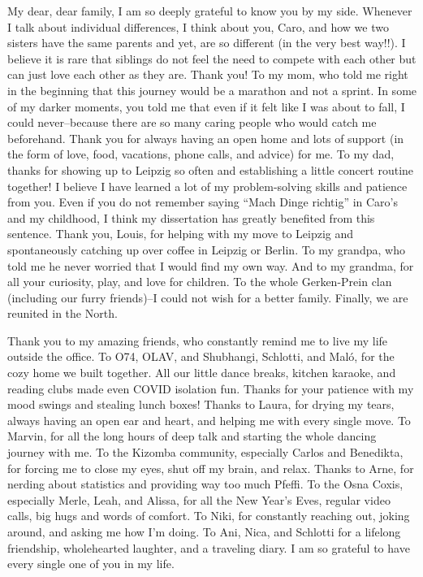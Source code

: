\documentclass[
]{scrbook}
\begin{document}
My dear, dear family, I am so deeply grateful to know you by my side. Whenever I talk about individual differences, I think about you, Caro, and how we two sisters have the same parents and yet, are so different (in the very best way!!). I believe it is rare that siblings do not feel the need to compete with each other but can just love each other as they are. Thank you! To my mom, who told me right in the beginning that this journey would be a marathon and not a sprint. In some of my darker moments, you told me that even if it felt like I was about to fall, I could never\thinspace --\thinspace because there are so many caring people who would catch me beforehand. Thank you for always having an open home and lots of support (in the form of love, food, vacations, phone calls, and advice) for me. To my dad, thanks for showing up to Leipzig so often and establishing a little concert routine together! I believe I have learned a lot of my problem-solving skills and patience from you. Even if you do not remember saying ``Mach Dinge richtig'' in Caro's and my childhood, I think my dissertation has greatly benefited from this sentence. Thank you, Louis, for helping with my move to Leipzig and spontaneously catching up over coffee in Leipzig or Berlin. To my grandpa, who told me he never worried that I would find my own way. And to my grandma, for all your curiosity, play, and love for children. To the whole Gerken-Prein clan (including our furry friends)\thinspace --\thinspace I could not wish for a better family. Finally, we are reunited in the North.

Thank you to my amazing friends, who constantly remind me to live my life outside the office. To O74, OLAV, and Shubhangi, Schlotti, and Maló, for the cozy home we built together. All our little dance breaks, kitchen karaoke, and reading clubs made even COVID isolation fun. Thanks for your patience with my mood swings and stealing lunch boxes! Thanks to Laura, for drying my tears, always having an open ear and heart, and helping me with every single move. To Marvin, for all the long hours of deep talk and starting the whole dancing journey with me. To the Kizomba community, especially Carlos and Benedikta, for forcing me to close my eyes, shut off my brain, and relax. Thanks to Arne, for nerding about statistics and providing way too much Pfeffi. To the Osna Coxis, especially Merle, Leah, and Alissa, for all the New Year's Eves, regular video calls, big hugs and words of comfort. To Niki, for constantly reaching out, joking around, and asking me how I'm doing. To Ani, Nica, and Schlotti for a lifelong friendship, wholehearted laughter, and a traveling diary. I am so grateful to have every single one of you in my life.
\end{document}
